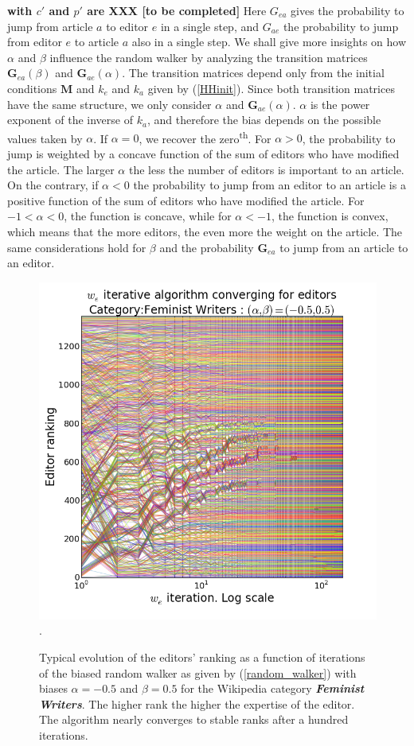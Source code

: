 {\bf with $c'$ and $p'$ are XXX [to be completed]} Here $G_{ea}$ gives the probability to jump from article $a$ to editor $e$ in a single step, and $G_{ae}$ the probability to jump from editor $e$ to article $a$ also in a single step. We shall give more insights on how $\alpha$ and $\beta$ influence the random walker by analyzing the transition matrices $\mathbf{G}_{ea}(\beta)$ and $\mathbf{G}_{ae}(\alpha)$. The transition matrices depend only from the initial conditions $\mathbf{M}$ and $k_e$ and $k_a$ given by (\ref{HHinit}). Since both transition matrices have the same structure, we only consider $\alpha$  and $\mathbf{G}_{ae}(\alpha)$. $\alpha$ is the power exponent of the inverse of $k_a$, and therefore the bias depends on the possible values taken by $\alpha$. If $\alpha = 0$, we recover the zero\textsuperscript{th}. For $\alpha > 0$, the probability to jump is weighted by a concave function of the sum of editors who have modified the article. The larger $\alpha$ the less the number of editors is important to an article. On the contrary, if $\alpha < 0$ the probability to jump from an editor to an article is a positive function of the sum of editors who have modified the article. For $-1 < \alpha < 0$, the function is concave, while for $\alpha < -1$, the function is convex, which means that the more editors, the even more the weight on the article. The same considerations hold for $\beta$ and the probability $\mathbf{G}_{ea}$ to jump from an article to an editor. 

\begin{figure}[!t]
\centering
\includegraphics[width=0.9\columnwidth]{Figures/fem_editors_iter_converge.png}.
\caption{Typical evolution of the editors' ranking as a function of iterations of the biased random walker as  given by (\ref{random_walker}) with biases $\alpha = -0.5$ and $\beta = 0.5$ for the Wikipedia category \textit{\textbf{ Feminist Writers}}. The higher rank the higher the expertise of the editor. The algorithm nearly converges to stable ranks after a hundred iterations.}
\label{fig:convergence}
\end{figure}

